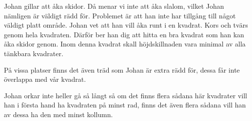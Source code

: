 
Johan gillar att åka skidor. Då menar vi inte att åka slalom, vilket Johan nämligen är väldigt rädd för. Problemet är att han inte har tillgång till något väldigt platt område. Johan vet att han vill åka runt i en kvadrat. Kors och tvärs genom hela kvadraten. Därför ber han dig att hitta en bra kvadrat som han kan åka skidor genom. Inom denna kvadrat skall höjdskillnaden vara minimal av alla tänkbara kvadrater. 

På vissa platser finns det även träd som Johan är extra rädd för, dessa får inte överlappa med vår kvadrat.

Johan orkar inte heller gå så långt så om det finns flera sådana här kvadrater vill han i första hand ha kvadraten på minst rad, finns det även flera sådana vill han av dessa ha den med minst kollumn. 




